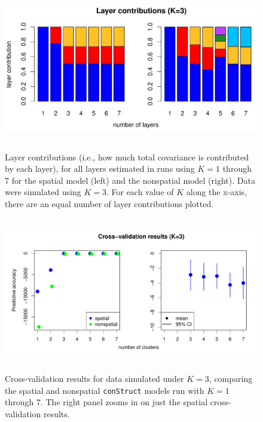 \documentclass[12pt]{article}
\begin{document}
\begin{figure}
	\centering
		{\includegraphics[width=5in,height=2.5in]{figs/sims/simK3_laycon_barplots.pdf}}
		\caption{
			Layer contributions (i.e., how much total covariance is contributed by each layer), 
			for all layers estimated in runs using $K = 1$ through 7 
			for the spatial model (left) and the nonspatial model (right).
			Data were simulated using $K=3$.
			For each value of $K$ along the x-axis, there are an equal number of layer contributions plotted.
		}\label{simK3_laycon}
\end{figure}

\begin{figure}
	\centering
		{\includegraphics[width=5in,height=2.5in]{figs/sims/simK3_std_xval.pdf}}
		\caption{
			Cross-validation results for data simulated under $K=3$,
			comparing the spatial and nonspatial \texttt{conStruct} models run with $K=1$ through 7.  
			The right panel zooms in on just the spatial cross-validation results.
		}\label{simK3_xval}
\end{figure}
\end{document}
